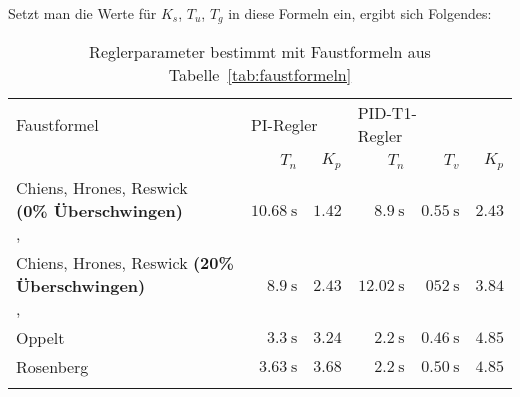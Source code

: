 Setzt man die Werte f\"ur $K_s$, $T_u$, $T_g$ in diese Formeln ein, ergibt sich Folgendes:

\begin{longtable}{p{50mm}rrrrr}
    \toprule


    Faustformel
    &
    \multicolumn{2}{l}{PI-Regler}
    &
    \multicolumn{2}{l}{PID-T1-Regler}
    \\

    &
    $T_n$
    &
    $K_p$
    &
    $T_n$
    &
    $T_v$
    &
    $K_p$
    \\

    \midrule

    \endhead
    \endfoot
    \endlastfoot


    \pbox{45mm}{Chiens, Hrones, Reswick \\ \small{\textbf{(0\% \"Uberschwingen)}} \\ \cite{ref:chiens_tsn}, \cite{ref:chiens_wiki}}
    &
    $\SI{10.68}{\second}$
    &
    $1.42$
    &
    $\SI{8.9}{\second}$
    &
    $\SI{0.55}{\second}$
    &
    $2.43$
    \\

    \addlinespace[1em]

    \pbox{45mm}{Chiens, Hrones, Reswick \small{\textbf{(20\% \"Uberschwingen)}} \\ \cite{ref:chiens_tsn}, \cite{ref:chiens_wiki}}
    &
    $\SI{8.9}{\second}$
    &
    $2.43$
    &
    $\SI{12.02}{\second}$
    &
    $\SI{052}{\second}$
    &
    $3.84$
    \\

    \addlinespace[1em]

    Oppelt \cite{ref:op_ros_zieg}
    &
    $\SI{3.3}{\second}$
    &
    $3.24$
    &
    $\SI{2.2}{\second}$
    &
    $\SI{0.46}{\second}$
    &
    $4.85$
    \\

    \addlinespace[1em]

    Rosenberg \cite{ref:op_ros_zieg}
    &
    $\SI{3.63}{\second}$
    &
    $3.68$
    &
    $\SI{2.2}{\second}$
    &
    $\SI{0.50}{\second}$
    &
    $4.85$
    \\

    \addlinespace[1em]

    \bottomrule
    \caption{Reglerparameter bestimmt mit Faustformeln aus Tabelle~\ref{tab:faustformeln}}
\label{tab:ff_results}
\end{longtable}
